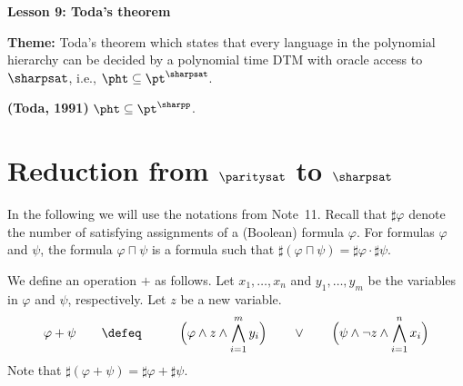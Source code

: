\documentclass[11pt, a4paper]{article}
\renewcommand{\lesson}{9}
\renewcommand{\lessontitle}{Toda's theorem}
\renewcommand{\fulltitle}{Lesson \lesson: \lessontitle}
\begin{document}
\date{}



\begin{center}
{\Large {\bf \fulltitle}}
\end{center}
\vspace{0.5cm}

\noindent
{\bf Theme:} Toda's theorem which states that every language in the polynomial hierarchy can be decided by a polynomial time DTM
 with oracle access to $\sharpsat$, i.e., $\pht \subseteq \pt^{\sharpsat}$.

\vspace{0.5cm}

\begin{theorem}
\label{theo:toda}
{\bf (Toda, 1991)}
$\pht\subseteq \pt^{\sharpp}$.
\end{theorem}


\section{Reduction from $\paritysat$ to $\sharpsat$} 

In the following we will use the notations from Note~11.
Recall that $\sharp \varphi$ denote the number of satisfying assignments of a (Boolean) formula $\varphi$.
For formulas $\varphi$ and $\psi$,
the formula $\varphi\sqcap\psi$ is a formula such that $\sharp(\varphi\sqcap\psi) = \sharp\varphi \cdot \sharp\psi$.

We define an operation $+$ as follows.
Let $x_1,\ldots,x_n$ and $y_1,\ldots,y_m$ be the variables in $\varphi$ and $\psi$, respectively.
Let $z$ be a new variable.
\begin{eqnarray*}
\varphi+\psi\qquad & \defeq &\qquad
\Big(\varphi \wedge z \wedge \bigwedge_{i=1}^m y_i\Big)
\qquad \vee \qquad
\Big(\psi \wedge \neg z \wedge \bigwedge_{i=1}^n x_i\Big)
\end{eqnarray*}
Note that $\sharp(\varphi+\psi) = \sharp\varphi + \sharp \psi$.
\end{document}
